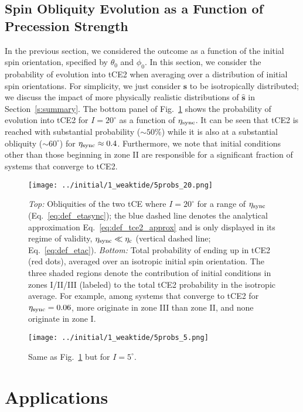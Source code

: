 \documentclass[
        fleqn,
        usenatbib,
    ]{mnras}
\newcommand*{\uv}[1]{\hat{\mathbf{#1}}}
\begin{document}
\subsection{Spin Obliquity Evolution as a Function of Precession Strength
}\label{ss:tce2_etasync}

In the previous section, we considered the outcome as a function of the initial
spin orientation, specified by $\theta_0$ and $\phi_0$. In this section, we
consider the probability of evolution into tCE2 when averaging over a
distribution of initial spin orientations. For simplicity, we just consider
$\uv{s}$ to be isotropically distributed; we discuss the impact of more
physically realistic distributions of $\uv{s}$ in Section~\ref{s:summary}. The
bottom panel of Fig.~\ref{fig:probs20} shows the probability of evolution into
tCE2 for $I = 20^\circ$ as a function of $\eta_{\rm sync}$. It can be seen that
tCE2 is reached with substantial probability ($\sim 50\%$) while it is also
at a substantial obliquity ($\sim 60^\circ$) for $\eta_{\rm sync} \approx 0.4$.
Furthermore, we note that initial conditions other than those beginning in zone
II are responsible for a significant fraction of systems that converge to tCE2.
\begin{figure}
    \centering
    \texttt{[image: ../initial/1\_weaktide/5probs\_20.png]}
    \caption{\emph{Top:} Obliquities of the two tCE where $I = 20^\circ$ for a
    range of $\eta_{\rm sync}$ (Eq.~\ref{eq:def_etasync}); the blue dashed line
    denotes the analytical approximation Eq.~\eqref{eq:def_tce2_approx} and is
    only displayed in its regime of validity, $\eta_{\rm sync} \ll \eta_{\rm c}$
    (vertical dashed line; Eq.~\ref{eq:def_etac}). \emph{Bottom:} Total
    probability of ending up in tCE2 (red dots), averaged over an isotropic
    initial spin orientation. The three shaded regions denote the contribution
    of initial conditions in zones I/II/III (labeled) to the total tCE2
    probability in the isotropic average. For example, among systems that
    converge to tCE2 for $\eta_{\rm sync} = 0.06$, more originate in zone III
    than zone II, and none originate in zone I.}\label{fig:probs20}
\end{figure}
\begin{figure}
    \centering
    \texttt{[image: ../initial/1\_weaktide/5probs\_5.png]}
    \caption{Same as Fig.~\ref{fig:probs20} but for $I =
    5^\circ$.}\label{fig:probs5}
\end{figure}

\section{Applications}\label{s:applications}
\end{document}
